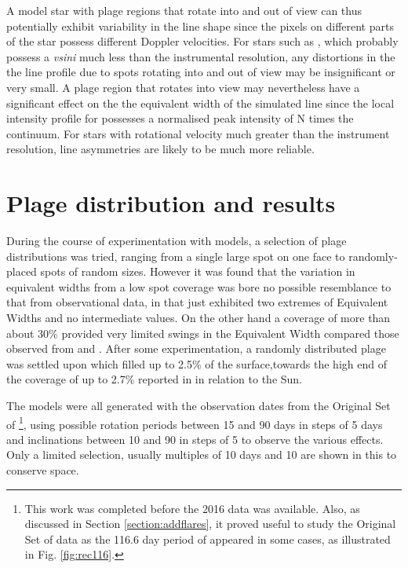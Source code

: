 A model star with plage regions that rotate into and out of view can thus potentially exhibit variability in the line
shape since the pixels on different parts of the star possess different Doppler velocities. For stars such as \prox,
which probably possess a \textit{vsini} much less than the instrumental resolution, any distortions in the the line
profile due to spots rotating into and out of view may be insignificant or very small. A plage region that rotates into
view may nevertheless have a significant effect on the the equivalent width of the simulated line since the
local intensity profile for {\ha} possesses a normalised peak intensity of N times the continuum. For stars with
rotational velocity much greater than the instrument resolution, line asymmetries are likely to be much more reliable.

\section{Plage distribution and results}
\protect\label{section:plagedists}

During the course of experimentation with models, a selection of plage distributions was tried, ranging from a single
large spot on one face to randomly-placed spots of random sizes. However it was found that the variation in equivalent
widths from a low spot coverage was bore no possible resemblance to that from observational data, in that just exhibited
two extremes of Equivalent Widths and no intermediate values. On the other hand a coverage of more than about 30\%
provided very limited swings in the Equivalent Width compared those observed from {\harps} and {\uves}. After some
experimentation, a randomly distributed plage was settled upon which filled up to 2.5\% of the surface,towards the high
end of the coverage of up to 2.7\% reported in \citet{guttenbrunner14} in relation to the Sun.

The models were all generated with the observation dates from the Original Set of {\harps}\footnote{This work was
  completed before the 2016 data was available. Also, as discussed in Section \ref{section:addflares}, it proved useful
  to study the Original Set of data as the 116.6 day period of \citet[Table 3]{suarezmascareno15} appeared in some
  cases, as illustrated in Fig. \ref{fig:rec116}.}, using possible rotation periods between 15 and 90 days in steps of 5 days and inclinations between
10{\degree} and 90{\degree} in steps of 5{\degree} to observe the various effects. Only a limited selection, usually
multiples of 10 days and 10{\degree} are shown in this {\paperorthesis} to conserve space.

